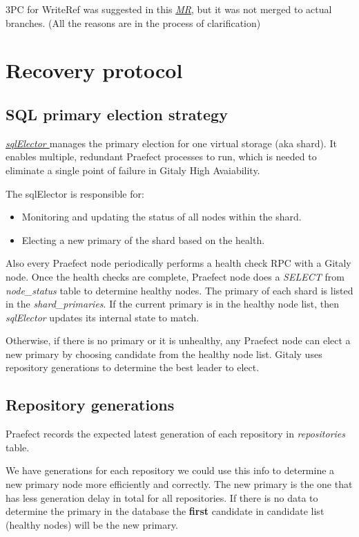 \documentclass[acmlarge, screen, nonacm]{acmart}
\begin{document}
3PC for WriteRef was suggested in this
\emph{\href{https://gitlab.com/gitlab-org/gitaly/-/issues/2466}{MR}},
but it was not merged to actual branches. (All the reasons are in the process of clarification)

\section{Recovery protocol}

\subsection{SQL primary election strategy}
\emph{\href{https://gitlab.com/gitlab-org/gitaly/-/blob/master/internal/praefect/nodes/sql_elector.go}{sqlElector }}manages the primary election for one virtual storage (aka
shard). It enables multiple, redundant Praefect processes to run,
which is needed to eliminate a single point of failure in Gitaly High
Avaiability.

The sqlElector is responsible for:
\begin{itemize}
\item Monitoring and updating the status of all nodes within the shard.
\item Electing a new primary of the shard based on the health.
\end{itemize}
Also every Praefect node periodically performs a health check RPC with a Gitaly node.  Once the health checks are complete, 
Praefect node does a \textit{SELECT} from \textit{node\_status} table to determine healthy nodes.
The primary of each shard is listed in the
\textit{shard\_primaries}. If the current primary is in the healthy
node list, then \textit{sqlElector} updates its internal state to match.

Otherwise, if there is no primary or it is unhealthy, any Praefect node
can elect a new primary by choosing candidate from the healthy node
list. Gitaly uses repository generations to determine the best leader to elect.  

\subsection{Repository generations }

Praefect records the expected latest generation of each repository  in \textit{repositories } table.

We have generations for each repository we could use this info to determine a new primary node more efficiently and correctly. 
The new primary is the one that has less generation delay in total for all repositories. If there is no data to determine the 
primary in the database the \textbf{first} candidate in candidate list (healthy nodes) will be the new primary.
\end{document}
